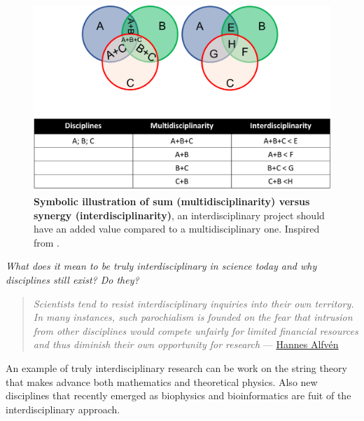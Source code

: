 \documentclass[12pt,]{book}
\theoremstyle{definition}
\theoremstyle{definition}
\theoremstyle{definition}
\theoremstyle{remark}
\begin{document}
\begin{figure}

{\centering \includegraphics[width=1\linewidth]{figures-ext/multidisc} 

}

\caption{\textbf{Symbolic illustration of sum
(multidisciplinarity) versus synergy (interdisciplinarity)}, an
interdisciplinary project should have an added value compared to a
multidisciplinary one. Inspired from \citep{Slavicek2012}.}\label{fig:multidisc}
\end{figure}






\emph{What does it mean to be truly interdisciplinary in science today
and why disciplines still exist? Do they?}

\begin{quote}
\emph{Scientists tend to resist interdisciplinary inquiries into their
own territory. In many instances, such parochialism is founded on the
fear that intrusion from other disciplines would compete unfairly for
limited financial resources and thus diminish their own opportunity for
research} ---
\href{http://www.azquotes.com/author/28130-Hannes_Alfven}{Hannes Alfvén}
\end{quote}

An example of truly interdisciplinary research can be work on the string
theory that makes advance both mathematics and theoretical physics. Also
new disciplines that recently emerged as biophysics and bioinformatics
are fuit of the interdisciplinary approach.
\end{document}
